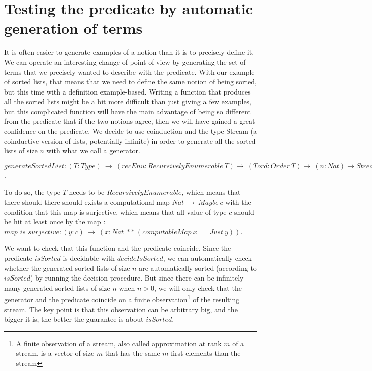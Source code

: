 \section{Testing the predicate by automatic generation of terms}

\label{sect:testingInside}


It is often easier to generate examples of a notion than it is to precisely define it. We can operate an interesting change of point of view by generating the set of terms that we precisely wanted to describe with the predicate. With our example of sorted lists, that means that we need to define the same notion of being sorted, but this time with a definition example-based. Writing a function that produces all the sorted lists might be a bit more difficult than just giving a few examples, but this complicated function will have the main advantage of being so different from the predicate that if the two notions agree, then we will have gained a great confidence on the predicate. We decide to use coinduction and the type Stream (a coinductive version of lists, potentially infinite) in order to generate all the sorted lists of size $n$ with what we call a generator.

$generateSortedList : (T:Type)\ \rightarrow\ (recEnu:RecursivelyEnumerable\ T) \rightarrow\ (Tord : Order\ T) \rightarrow\ (n:Nat) \rightarrow Stream\ (List\ T)$.

To do so, the type $T$ needs to be $RecursivelyEnumerable$, which means that there should there should exists a computational map $Nat\ \rightarrow\ Maybe\ c$ with the condition that this map is surjective, which means that all value of type $c$ should be hit at least once by the map : $map\_is\_surjective : (y:c)\ \rightarrow\ (x:Nat\ **\ (computableMap\ x\ =\ Just\ y))$.

We want to check that this function and the predicate coincide. Since the predicate $isSorted$ is decidable with $decideIsSorted$, we can automatically check whether the generated sorted lists of size $n$ are automatically sorted (according to $isSorted$) by running the decision procedure. But since there can be infinitely many generated sorted lists of size $n$ when $n > 0$, we will only check that the generator and the predicate coincide on a finite observation\footnote{A finite observation of a stream, also called approximation at rank $m$ of a stream, is a vector of size $m$ that has the same $m$ first elements than the stream} of the resulting stream. The key point is that this observation can be arbitrary big, and the bigger it is, the better the guarantee is about $isSorted$.


